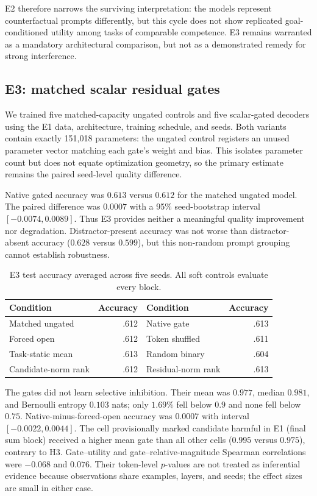 \documentclass[10pt]{article}
\begin{document}
E2 therefore narrows the surviving interpretation: the models represent counterfactual prompts differently, but this cycle does not show replicated goal-conditioned utility among tasks of comparable competence. E3 remains warranted as a mandatory architectural comparison, but not as a demonstrated remedy for strong interference.

\subsection{E3: matched scalar residual gates}
We trained five matched-capacity ungated controls and five scalar-gated decoders using the E1 data, architecture, training schedule, and seeds. Both variants contain exactly 151,018 parameters: the ungated control registers an unused parameter vector matching each gate's weight and bias. This isolates parameter count but does not equate optimization geometry, so the primary estimate remains the paired seed-level quality difference.

Native gated accuracy was $0.613$ versus $0.612$ for the matched ungated model. The paired difference was $0.0007$ with a 95\% seed-bootstrap interval $[-0.0074,0.0089]$. Thus E3 provides neither a meaningful quality improvement nor degradation. Distractor-present accuracy was not worse than distractor-absent accuracy ($0.628$ versus $0.599$), but this non-random prompt grouping cannot establish robustness.

\begin{table}[ht]
\centering
\caption{E3 test accuracy averaged across five seeds. All soft controls evaluate every block.}
\begin{tabular}{lr@{\qquad}lr}
\toprule
Condition & Accuracy & Condition & Accuracy \\
\midrule
Matched ungated & .612 & Native gate & .613 \\
Forced open & .612 & Token shuffled & .611 \\
Task-static mean & .613 & Random binary & .604 \\
Candidate-norm rank & .612 & Residual-norm rank & .613 \\
\bottomrule
\end{tabular}
\end{table}

The gates did not learn selective inhibition. Their mean was $0.977$, median $0.981$, and Bernoulli entropy $0.103$ nats; only $1.69\%$ fell below $0.9$ and none fell below $0.75$. Native-minus-forced-open accuracy was $0.0007$ with interval $[-0.0022,0.0044]$. The cell provisionally marked candidate harmful in E1 (final sum block) received a higher mean gate than all other cells ($0.995$ versus $0.975$), contrary to H3. Gate--utility and gate--relative-magnitude Spearman correlations were $-0.068$ and $0.076$. Their token-level $p$-values are not treated as inferential evidence because observations share examples, layers, and seeds; the effect sizes are small in either case.
\end{document}
